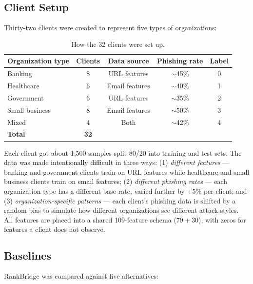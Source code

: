 \documentclass[12pt,a4paper]{article}
\begin{document}
\subsection{Client Setup}

Thirty-two clients were created to represent five types of organizations:

\begin{table}[H]
\centering
\caption{How the 32 clients were set up.}\label{tab:clients}
\begin{tabular}{lcccc}
\toprule
\textbf{Organization type} & \textbf{Clients} & \textbf{Data source} & \textbf{Phishing rate} & \textbf{Label} \\
\midrule
Banking       & 8 & URL features  & $\sim$45\% & 0 \\
Healthcare    & 6 & Email features & $\sim$40\% & 1 \\
Government    & 6 & URL features  & $\sim$35\% & 2 \\
Small business & 8 & Email features & $\sim$50\% & 3 \\
Mixed         & 4 & Both          & $\sim$42\% & 4 \\
\midrule
\textbf{Total} & \textbf{32} & & & \\
\bottomrule
\end{tabular}
\end{table}

Each client got about 1{,}500 samples split 80/20 into training and test sets. The data was made intentionally difficult in three ways: (1) \textit{different features} --- banking and government clients train on URL features while healthcare and small business clients train on email features; (2) \textit{different phishing rates} --- each organization type has a different base rate, varied further by $\pm 5\%$ per client; and (3) \textit{organization-specific patterns} --- each client's phishing data is shifted by a random bias to simulate how different organizations see different attack styles. All features are placed into a shared 109-feature schema ($79 + 30$), with zeros for features a client does not observe.

\subsection{Baselines}

RankBridge was compared against five alternatives:
\end{document}
